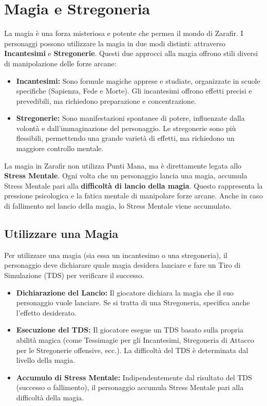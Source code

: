 \documentclass[../manuale_main.tex]{subfiles}
\begin{document}
\section{Magia e Stregoneria}

La magia è una forza misteriosa e potente che permea il mondo di Zarafir. I personaggi possono utilizzare la magia in due modi distinti: attraverso \textbf{Incantesimi} e \textbf{Stregonerie}. Questi due approcci alla magia offrono stili diversi di manipolazione delle forze arcane:

\begin{itemize}
    \item \textbf{Incantesimi:} Sono formule magiche apprese e studiate, organizzate in scuole specifiche (Sapienza, Fede e Morte). Gli incantesimi offrono effetti precisi e prevedibili, ma richiedono preparazione e concentrazione.
    \item \textbf{Stregonerie:} Sono manifestazioni spontanee di potere, influenzate dalla volontà e dall'immaginazione del personaggio. Le stregonerie sono più flessibili, permettendo una grande varietà di effetti, ma richiedono un maggiore controllo mentale.
\end{itemize}

La magia in Zarafir non utilizza Punti Mana, ma è direttamente legata allo \textbf{Stress Mentale}. Ogni volta che un personaggio lancia una magia, accumula Stress Mentale pari alla \textbf{difficoltà di lancio della magia}. Questo rappresenta la pressione psicologica e la fatica mentale di manipolare forze arcane. Anche in caso di fallimento nel lancio della magia, lo Stress Mentale viene accumulato.

\subsection{Utilizzare una Magia}
Per utilizzare una magia (sia essa un incantesimo o una stregoneria), il personaggio deve dichiarare quale magia desidera lanciare e fare un Tiro di Simulazione (TDS) per verificare il successo. 

\begin{itemize}
    \item \textbf{Dichiarazione del Lancio:} Il giocatore dichiara la magia che il suo personaggio vuole lanciare. Se si tratta di una Stregoneria, specifica anche l'effetto desiderato.
    \item \textbf{Esecuzione del TDS:} Il giocatore esegue un TDS basato sulla propria abilità magica (come Tessimagie per gli Incantesimi, Stregoneria di Attacco per le Stregonerie offensive, ecc.). La difficoltà del TDS è determinata dal livello della magia.
    \item \textbf{Accumulo di Stress Mentale:} Indipendentemente dal risultato del TDS (successo o fallimento), il personaggio accumula Stress Mentale pari alla difficoltà della magia.
\end{itemize}
\end{document}
